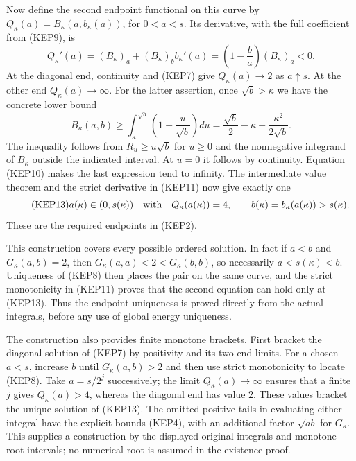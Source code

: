 \documentclass[11pt,a4paper]{article}
\begin{document}
Now define the second endpoint functional on this curve by
$Q_\kappa(a)=B_\kappa(a,b_\kappa(a))$, for $0<a<s$. Its derivative, with the full
coefficient from (KEP9), is
\begin{equation}\tag{KEP11}
 Q_\kappa'(a)=(B_\kappa)_a+(B_\kappa)_b b_\kappa'(a)
       =\left(1-\frac ba\right)(B_\kappa)_a<0.
\end{equation}
At the diagonal end, continuity and (KEP7) give
$Q_\kappa(a)\to2$ as $a\uparrow s$. At the other end $Q_\kappa(a)\to\infty$.
For the latter assertion, once $\sqrt b>\kappa$ we have the concrete lower
bound
\begin{equation}\tag{KEP12}
 B_\kappa(a,b)\geq\int_\kappa^{\sqrt b}
               \left(1-\frac u{\sqrt b}\right)du
 =\frac{\sqrt b}{2}-\kappa+\frac{\kappa^2}{2\sqrt b}.
\end{equation}
The inequality follows from $R_u\geq u\sqrt b$ for $u\geq0$ and
the nonnegative integrand of $B_\kappa$ outside the indicated interval.
At $u=0$ it follows by continuity. Equation (KEP10) makes the last
expression tend to infinity. The intermediate value theorem and the
strict derivative in (KEP11) now give exactly one
\begin{equation}\tag{KEP13}
 a(\kappa)\in(0,s(\kappa))\quad\hbox{with}\quad Q_\kappa(a(\kappa))=4,
 \qquad b(\kappa)=b_\kappa(a(\kappa))>s(\kappa).
\end{equation}
These are the required endpoints in (KEP2).

This construction covers every possible ordered solution. In fact if
$a<b$ and $G_\kappa(a,b)=2$, then
$G_\kappa(a,a)<2<G_\kappa(b,b)$, so necessarily $a<s(\kappa)<b$.
Uniqueness of (KEP8) then places the pair on the same curve, and the
strict monotonicity in (KEP11) proves that the second equation can
hold only at (KEP13). Thus the endpoint uniqueness is proved directly
from the actual integrals, before any use of global energy uniqueness.

The construction also provides finite monotone brackets. First bracket
the diagonal solution of (KEP7) by positivity and its two end limits.
For a chosen $a<s$, increase $b$ until $G_\kappa(a,b)>2$ and then use
strict monotonicity to locate (KEP8). Take $a=s/2^j$ successively;
the limit $Q_\kappa(a)\to\infty$ ensures that a finite $j$ gives
$Q_\kappa(a)>4$, whereas the diagonal end has value $2$.
These values bracket the unique solution of (KEP13).
The omitted positive tails in evaluating either integral have the
explicit bounds (KEP4), with an additional factor $\sqrt{ab}$ for
$G_\kappa$. This supplies a construction by the displayed original
integrals and monotone root intervals; no numerical root is assumed
in the existence proof.
\end{document}

